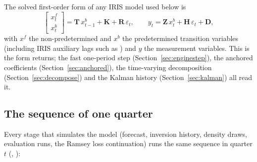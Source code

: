 \documentclass[11pt,a4paper]{article}
\newcommand{\T}{\mathbf{T}}
\newcommand{\K}{\mathbf{K}}
\newcommand{\Rs}{\mathbf{R}}
\newcommand{\Z}{\mathbf{Z}}
\newcommand{\Hs}{\mathbf{H}}
\newcommand{\D}{\mathbf{D}}
\begin{document}
The solved first-order form of any IRIS model used below is
\begin{equation}\label{eq:sspace}
  \begin{bmatrix} x^f_t \\ x^b_t \end{bmatrix} = \T\, x^b_{t-1} + \K + \Rs\, \varepsilon_t,
  \qquad
  y_t = \Z\, x^b_t + \Hs\, \varepsilon_t + \D,
\end{equation}
with $x^f$ the non-predetermined and $x^b$ the predetermined transition variables (including
IRIS auxiliary lags such as ) and $y$ the measurement variables. This is the form
 returns; the fast one-period step
(Section~\ref{sec:enginestep}), the anchored coefficients (Section~\ref{sec:anchored}), the
time-varying decomposition (Section~\ref{sec:decompose}) and the Kalman history
(Section~\ref{sec:kalman}) all read it.

\subsection{The sequence of one quarter}\label{sec:timing}

Every stage that simulates the model (forecast, inversion history, density draws, evaluation
runs, the Ramsey loss continuation) runs the same sequence in quarter $t$
(, ):
\end{document}
